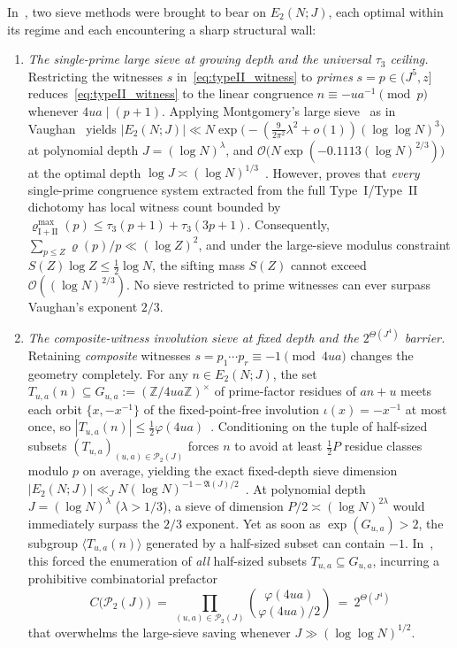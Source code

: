 \documentclass[11pt, a4paper]{article}
\theoremstyle{plain}
\theoremstyle{definition}
\newcommand{\Z}{\mathbb{Z}}
\begin{document}
In~\cite{dahan2026a}, two sieve methods were brought to bear on $E_2(N;J)$, each optimal within its regime and each encountering a sharp structural wall:
\begin{enumerate}[(1)]
    \item \emph{The single-prime large sieve at growing depth and the universal $\tau_3$ ceiling.} Restricting the witnesses $s$ in~\eqref{eq:typeII_witness} to \emph{primes} $s=p\in(J^{5},z]$ reduces~\eqref{eq:typeII_witness} to the linear congruence $n\equiv-u a^{-1}\pmod p$ whenever $4ua\mid(p+1)$. Applying Montgomery's large sieve~\cite{montgomery1971} as in Vaughan~\cite{vaughan1970} yields $|E_2(N;J)|\ll N\exp\big(-(\frac{9}{2\pi^{2}}\lambda^{2}+o(1))(\log\log N)^{3}\big)$ at polynomial depth $J=(\log N)^{\lambda}$, and $\mathcal{O}\big(N\exp(-0.1113(\log N)^{2/3})\big)$ at the optimal depth $\log J\asymp(\log N)^{1/3}$~\cite[Thm.~4.28]{dahan2026a}. However, \cite[Thm.~4.30]{dahan2026a} proves that \emph{every} single-prime congruence system extracted from the full Type~I/Type~II dichotomy has local witness count bounded by $\varrho_{\mathrm{I+II}}^{\max}(p)\le\tau_3(p+1)+\tau_3(3p+1)$. Consequently, $\sum_{p\le Z}\varrho(p)/p\ll(\log Z)^{2}$, and under the large-sieve modulus constraint $S(Z)\log Z\le\frac12\log N$, the sifting mass $S(Z)$ cannot exceed $\mathcal{O}((\log N)^{2/3})$. No sieve restricted to prime witnesses can ever surpass Vaughan's exponent $2/3$.
    \item \emph{The composite-witness involution sieve at fixed depth and the $2^{\Theta(J^{4})}$ barrier.} Retaining \emph{composite} witnesses $s=p_1\cdots p_r\equiv-1\pmod{4ua}$ changes the geometry completely. For any $n\in E_2(N;J)$, the set $T_{u,a}(n)\subseteq G_{u,a}:=(\Z/4ua\Z)^{\times}$ of prime-factor residues of $an+u$ meets each orbit $\{x,-x^{-1}\}$ of the fixed-point-free involution $\iota(x)=-x^{-1}$ at most once, so $|T_{u,a}(n)|\le\frac12\varphi(4ua)$~\cite[Lemma~4.2]{dahan2026a}. Conditioning on the tuple of half-sized subsets $(T_{u,a})_{(u,a)\in\mathcal{P}_2(J)}$ forces $n$ to avoid at least $\frac12 P$ residue classes modulo $p$ on average, yielding the exact fixed-depth sieve dimension $|E_2(N;J)|\ll_J N(\log N)^{-1-\mathfrak{A}(J)/2}$~\cite[Thm.~4.3]{dahan2026a}. At polynomial depth $J=(\log N)^{\lambda}$ ($\lambda>1/3$), a sieve of dimension $P/2\asymp(\log N)^{2\lambda}$ would immediately surpass the $2/3$ exponent. Yet as soon as $\exp(G_{u,a})>2$, the subgroup $\langle T_{u,a}(n)\rangle$ generated by a half-sized subset can contain $-1$. In~\cite{dahan2026a}, this forced the enumeration of \emph{all} half-sized subsets $T_{u,a}\subseteq G_{u,a}$, incurring a prohibitive combinatorial prefactor
    \[
    C\big(\mathcal{P}_2(J)\big)\ =\ \prod_{(u,a)\in\mathcal{P}_2(J)}\binom{\varphi(4ua)}{\varphi(4ua)/2}\ =\ 2^{\Theta(J^{4})}
    \]
    that overwhelms the large-sieve saving whenever $J\gg(\log\log N)^{1/2}$.
\end{enumerate}
\end{document}

